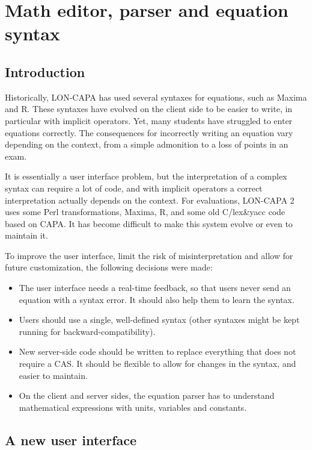 \chapter{Math editor, parser and equation syntax}

\section{Introduction}

Historically, LON-CAPA has used several syntaxes for equations, such as Maxima and R.
These syntaxes have evolved on the client side to be easier to write, in particular with implicit operators.
Yet, many students have struggled to enter equations correctly. The consequences for incorrectly
writing an equation vary depending on the context, from a simple admonition to a loss of points in an exam.

It is essentially a user interface problem, but the interpretation of a complex syntax can require
a lot of code, and with implicit operators a correct interpretation actually depends on the context.
For evaluations, LON-CAPA 2 uses some Perl transformations, Maxima, R,
and some old C/lex\&yacc code based on CAPA.
It has become difficult to make this system evolve or even to maintain it.

To improve the user interface, limit the risk of misinterpretation and allow for future customization,
the following decisions were made:
\begin{itemize}
\item The user interface needs a real-time feedback, so that users never send an equation with a syntax error.
It should also help them to learn the syntax.
\item Users should use a single, well-defined syntax
(other syntaxes might be kept running for backward-compatibility).
\item New server-side code should be written to replace everything that does not require a CAS.
It should be flexible to allow for changes in the syntax, and easier to maintain.
\item On the client and server sides, the equation parser has to understand mathematical expressions with units,
variables and constants.
\end{itemize}


\section{A new user interface}

